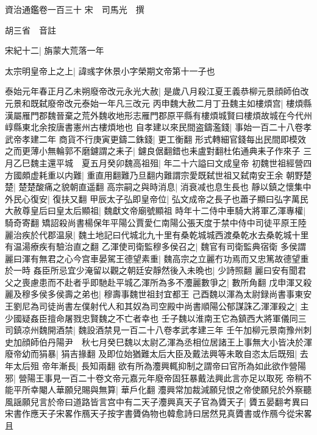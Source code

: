 資治通鑑卷一百三十
宋　司馬光　撰

胡三省　音註

宋紀十二|{
	旃蒙大荒落一年}


太宗明皇帝上之上|{
	諱彧字休景小字榮期文帝第十一子也}


泰始元年春正月乙未朔廢帝改元永光大赦|{
	是歲八月殺江夏王義恭柳元景顔師伯改元景和既弑廢帝改元泰始一年凡三改元}
丙申魏大赦二月丁丑魏主如樓煩宫|{
	樓煩縣漢屬雁門郡魏晉棄之荒外魏收地形志雁門郡原平縣有樓煩城賢曰樓煩故城在今代州崞縣東北余按唐書憲州古樓煩地也}
自孝建以來民間盗鑄濫錢|{
	事始一百二十八卷孝武帝孝建二年}
商貨不行庚寅更鑄二銖錢|{
	更工衡翻}
形式轉細官錢每出民間即模效之而更薄小無輪郭不磨鑢謂之耒子|{
	鑢良倨翻錯也耒盧對翻杜佑通典耒子作來子}
三月乙巳魏主還平城　夏五月癸卯魏高祖殂|{
	年二十六謚曰文成皇帝}
初魏世祖經營四方國頗虚耗重以内難|{
	重直用翻難乃旦翻内難謂宗愛既弑世祖又弑南安王余}
朝野楚楚|{
	楚楚酸痛之貌朝直遥翻}
高宗嗣之與時消息|{
	消衰减也息生長也}
靜以鎮之懷集中外民心復安|{
	復扶又翻}
甲辰太子弘即皇帝位|{
	弘文成帝之長子也蕭子顯曰弘字萬民}
大赦尊皇后曰皇太后顯祖|{
	魏獻文帝廟號顯祖}
時年十二侍中車騎大將軍乙渾專權|{
	騎奇寄翻}
矯詔殺尚書楊保年平陽公賈愛仁南陽公張天度于禁中侍中司徒平原王陸麗治疾於代郡温泉|{
	魏土地記曰代城北九十里有桑乾城城西渡桑乾水去桑乾城十里有温湯療疾有驗治直之翻}
乙渾使司衛監穆多侯召之|{
	魏官有司衛監典宿衛}
多侯謂麗曰渾有無君之心今宫車晏駕王德望素重|{
	魏高宗之立麗冇功焉而又忠篤故德望重於一時}
姦臣所忌宜少淹留以觀之朝廷安靜然後入未晩也|{
	少詩照翻}
麗曰安有聞君父之喪慮患而不赴者乎即馳赴平城乙渾所為多不灋麗數爭之|{
	數所角翻}
戊申渾又殺麗及穆多侯多侯壽之弟也|{
	穆壽事魏世祖封宜都王}
己酉魏以渾為太尉録尚書事東安王劉尼為司徒尚書左僕射代人和其奴為司空殿中尚書順陽公郁謀誅乙渾渾殺之|{
	主少國疑姦臣擅命屠戮忠賢魏之不亡者幸也}
壬子魏以淮南王它為鎮西大將軍儀同三司鎮凉州魏開酒禁|{
	魏設酒禁見一百二十八卷孝武孝建三年}
壬午加柳元景南豫州刺史加顔師伯丹陽尹　秋七月癸巳魏以太尉乙渾為丞相位居諸王上事無大小皆决於渾　廢帝幼而狷暴|{
	狷吉掾翻}
及即位始猶難太后大臣及戴法興等未敢自恣太后既殂|{
	去年太后殂}
帝年漸長|{
	長知兩翻}
欲有所為灋興輒抑制之謂帝曰官所為如此欲作營陽邪|{
	營陽王事見一百二十卷文帝元嘉元年廢帝固狂暴戴法興此言亦足以取死}
帝稍不能平所幸閹人華願兒賜與無算|{
	華戶化翻}
灋興常加裁減願兒恨之帝使願兒於外察聽風謡願兒言於帝曰道路皆言宫中有二天子灋興真天子官為贗天子|{
	贗五晏翻考異曰宋書作應天子宋畧作鴈天子按字書贗偽物也韓愈詩曰居然見真贗書或作鴈今從宋畧}
且

